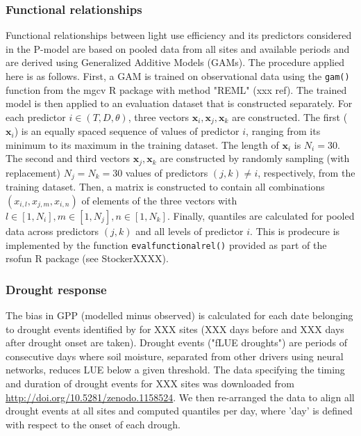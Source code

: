 \documentclass{myreport}
\begin{document}
\subsubsection{Functional relationships}
\label{sec:gam}

Functional relationships between light use efficiency and its predictors considered in the P-model are based on pooled data from all sites and available periods and are derived using Generalized Additive Models (GAMs). The procedure applied here is as follows. First, a GAM is trained on observational data using the \texttt{gam()}  function from the mgcv R package with method "REML" (xxx ref). The trained model is then applied to an evaluation dataset that is constructed separately. For each predictor $i \in (T, D, \theta)$, three vectors $\mathbf{x}_i, \mathbf{x}_j, \mathbf{x}_k$ are constructed. The first ($\mathbf{x}_i$) is an equally spaced sequence of values of predictor $i$, ranging from its minimum to its maximum in the training dataset. The length of $\mathbf{x}_i$ is $N_i=30$. The second and third vectors $\mathbf{x}_j, \mathbf{x}_k$ are constructed by randomly sampling (with replacement) $N_j=N_k=30$ values of predictors $(j,k)\neq i$, respectively, from the training dataset. Then, a matrix is constructed to contain all combinations $(x_{i,l}, x_{j,m}, x_{i,n})$ of elements of the three vectors with $l \in [1,N_i], m \in [1,N_j], n \in [1,N_k]$. Finally, quantiles are calculated for pooled data across predictors $(j,k)$ and all levels of predictor $i$. This is prodecure is implemented by the function \texttt{eval\textunderscore functionalrel()} provided as part of the rsofun R package (see StockerXXXX).

\subsubsection{Drought response}
\label{sec:droughtresponse}
The bias in GPP (modelled minus observed) is calculated for each date belonging to drought events identified by \cite{Stocker2018newphyt} for XXX sites (XXX days before and XXX days after drought onset are taken). Drought events ("fLUE droughts") are periods of consecutive days where soil moisture, separated from other drivers using neural networks, reduces LUE below a given threshold. The data specifying the timing and duration of drought events for XXX sites was downloaded from \url{http://doi.org/10.5281/zenodo.1158524}. We then re-arranged the data to align all drought events at all sites and computed quantiles per day, where 'day' is defined with respect to the onset of each drough. 
\end{document}
